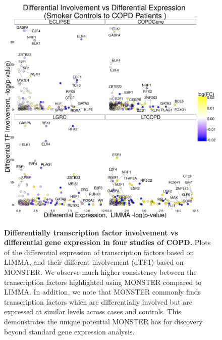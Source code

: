 \begin{figure}
\textbf{\includegraphics[width=1\linewidth]{figures/dTFIvsLIMMAall}
}\caption{\textbf{Differentially transcription factor involvement vs differential gene expression in four studies of COPD.}  Plots of the differential expression of transcription factors based on LIMMA, and their different involvement (dTF1) based on MONSTER. We observe much higher consistency between the transcription factors highlighted using MONSTER compared to LIMMA. In addition, we note that MONSTER commonly finds transcription factors which are differentially involved but are expressed at similar levels across cases and controls. This demonstrates the unique potential MONSTER has for discovery beyond standard gene expression analysis.}

\label{fig:sup_expression}
\end{figure}

